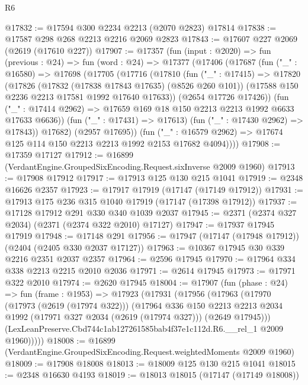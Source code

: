 \begin{lexlean}{R6}
\begin{coremodule}
@17832 := @17594 @300 @2234 @2213 (@2070 @2823) @17814
@17838 := @17587 @298 @268 @2213 @2216 @2069 @2823
@17843 := @17607 @227 @2069 (@2619 (@17610 @227))
@17907 := @17357
    (fun (input : @2020) =>
    fun (previous : @24) =>
    fun (word : @24) =>
    @17377
      (@17406
        (@17687
          (fun ("_" : @16580) =>
          @17698
            (@17705
              (@17716
                (@17810
                  (fun ("_" : @17415) =>
                  @17820
                    (@17826
                      (@17832 (@17838 @17843 @17635) (@8526 @260 @101))
                      (@17588 @150 @2236 @2213 @17581 @1992 @17640 @17633))
                    (@2654 @17726 @17426))
                  (fun ("_" : @17414 @2962) =>
                  @17659 @169 @18 @150 @2213 @2213 @1992 @6633 @17633 @6636))
                (fun ("_" : @17431) => @17613)
                (fun ("_" : @17430 @2962) => @17843))
              @17682)
            (@2957 @17695))
          (fun ("_" : @16579 @2962) =>
          @17674 @125 @114 @150 @2213 @2213 @1992 @2153 @17682 @4094))))
@17908 := @17359 @17127
@17912 := @16899 (VerdantEngine.GroupedSixEncoding.Request.sixInverse @2009 @1960)
@17913 := @17908 @17912
@17917 := @17913 @125 @130 @215 @1041
@17919 := @2348 @16626 @2357
@17923 := @17917 @17919 (@17147 (@17149 @17912))
@17931 := @17913 @175 @236 @315 @1040 @17919 (@17147 (@17398 @17912))
@17937 := @17128 @17912 @291 @330 @340 @1039 @2037
@17945 := @2371 (@2374 @327 @2034) (@2371 (@2374 @322 @2010) @17127)
@17947 := @17937 @17945 @17919
@17948 := @17148 @291
@17956 := @17947 (@17147 (@17948 @17912)) (@2404 (@2405 @330 @2037 @17127))
@17963 := @10367 @17945 @30 @339 @2216 @2351 @2037 @2357
@17964 := @2596 @17945
@17970 := @17964 @334 @338 @2213 @2215 @2010 @2036
@17971 := @2614 @17945
@17973 := @17971 @322 @2010
@17974 := @2620 @17945
@18004 := @17907
    (fun (phase : @24) =>
    fun (frame : @1953) =>
    @17923
      (@17931
        (@17956
          (@17963
            (@17970
              (@17973 (@2619 (@17974 @322)))
              (@17964
                @336
                @150
                @2213
                @2213
                @2034
                @1992
                (@17971 @327 @2034 (@2619 (@17974 @327)))
                (@2649 @17945)))
            (LexLeanPreserve.Cbd744c1ab127261585bab4f37e1c112d.R6.__rel_1 @2009 @1960)))))
@18008 := @16899 (VerdantEngine.GroupedSixEncoding.Request.weightedMoments @2009 @1960)
@18009 := @17908 @18008
@18013 := @18009 @125 @130 @215 @1041
@18015 := @2348 @16630 @4193
@18019 := @18013 @18015 (@17147 (@17149 @18008))

\end{coremodule}
\end{lexlean}
